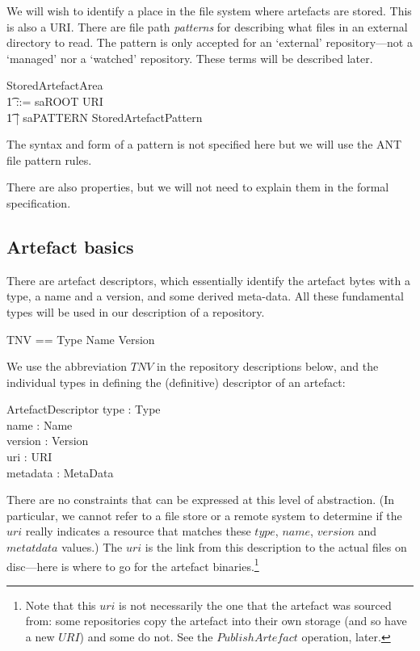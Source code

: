 \documentclass[a4paper,titlepage,twoside,12pt]{article}
\begin{document}
We will wish to identify a place in the file system where artefacts are stored. This is also a URI. There are file path \emph{patterns}  for describing what files in an external directory to read. The pattern is only accepted for an `external' repository---not a `managed' nor a `watched' repository. These terms will be described later.
\begin{zed}
	[StoredArtefactPattern]
\also
	StoredArtefactArea \\
	\t1 ::=	 saROOT \ldata URI \rdata	\\
	\t1 |  saPATTERN \ldata StoredArtefactPattern \rdata
\end{zed}
The syntax and form of a pattern is not specified here but we will use the ANT file pattern rules.

There are also properties, but we will not need to explain them in the formal specification.
\begin{zed}
 	[Properties]
\end{zed}

\subsection{Artefact basics}
There are artefact descriptors, which essentially identify the artefact bytes with a type, a name and a version, and some derived meta-data. All these fundamental types will be used in our description of a repository.
\begin{zed}
\also
	TNV == Type \cross Name \cross Version
\end{zed}
We use the abbreviation $TNV$ in the repository descriptions below, and the individual types in defining the (definitive) descriptor of an artefact:
\begin{schema}{ArtefactDescriptor}
	type : Type	\\
	name : Name	\\
	version : Version	\\
	uri : URI	\\
	metadata : MetaData
\end{schema}
There are no constraints that can be expressed at this level of abstraction. (In particular, we cannot refer to a file store or a remote system to determine if the $uri$ really indicates a resource that matches these $type$, $name$, $version$ and $metatdata$ values.) The $uri$ is the link from this description to the actual files on disc---here is where to go for the artefact binaries.\footnote{Note that this $uri$ is not necessarily the one that the artefact was sourced from: some repositories copy the artefact into their own storage (and so have a new $URI$) and some do not. See the $PublishArtefact$ operation, later.}
\end{document}
